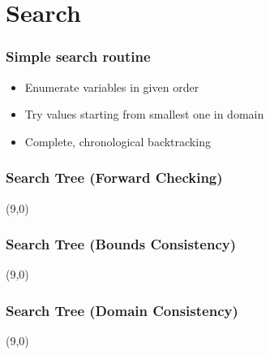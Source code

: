 \documentclass{beamer}
\begin{document}
\section{Search}

\begin{frame}
\frametitle{Simple search routine}
\begin{itemize}
\item Enumerate variables in given order
\item Try values starting from smallest one in domain
\item Complete, chronological backtracking
\end{itemize}
\end{frame}

\begin{frame}[label=searchfc]
\frametitle{Search Tree (Forward Checking)}
\begin{textblock}{5.5}(9,0)
\only<1>{\scalebox{0.7}{}}
\only<2>{\scalebox{0.7}{}}
\end{textblock}

\vfill
{}
\end{frame}


\begin{frame}[label=seachbc]
\frametitle{Search Tree (Bounds Consistency)}
\begin{textblock}{5.5}(9,0)
\only<1>{\scalebox{0.7}{}}
\only<3>{\scalebox{0.7}{}}
\end{textblock}

\vfill
{}
\end{frame}

\begin{frame}[label=searchgac]
\frametitle{Search Tree (Domain Consistency)}
\begin{textblock}{5.5}(9,0)
\only<1>{\scalebox{0.7}{}}
\end{textblock}

\vfill
{}
\end{frame}
\end{document}
